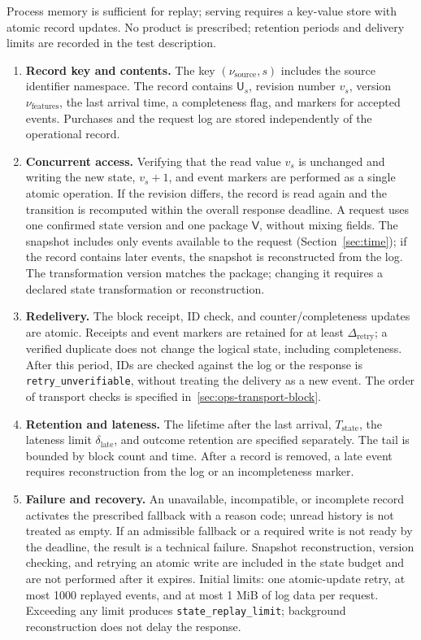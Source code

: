 \documentclass[12pt,a4paper]{article}
\newcommand{\code}[1]{{\ttfamily\small\nolinkurl{#1}}}
\theoremstyle{plainru}
\begin{document}
Process memory is sufficient for replay; serving requires
a key-value store with atomic record updates. No product is prescribed;
retention periods and delivery limits are recorded in the test description.
\begin{enumerate}
\item \textbf{Record key and contents.}
The key $(\nu_{\mathrm{source}},s)$ includes the source identifier
namespace. The record contains $\mathsf U_s$, revision number $v_s$,
version $\nu_{\mathrm{features}}$, the last arrival time,
a completeness flag, and markers for accepted events.
Purchases and the request log are stored independently of the operational record.

\item \textbf{Concurrent access.}
Verifying that the read value $v_s$ is unchanged and writing the new state,
$v_s+1$, and event markers are performed as a single atomic operation.
If the revision differs, the record is read again and the transition is recomputed
within the overall response deadline.
A request uses one confirmed state version and one package
$\mathsf V$, without mixing fields. The snapshot includes only events available to the request
(Section~\ref{sec:time}); if the record contains later
events, the snapshot is reconstructed from the log.
The transformation version matches the package; changing it requires
a declared state transformation or reconstruction.

\item \textbf{Redelivery.}
The block receipt, ID check, and counter/completeness updates are atomic.
Receipts and event markers are retained for at least $\Delta_{\mathrm{retry}}$;
a verified duplicate does not change the logical state, including completeness.
After this period, IDs are checked against the log or the response is
\code{retry_unverifiable}, without treating the delivery as a new event.
The order of transport checks is specified in~\ref{sec:ops-transport-block}.

\item \textbf{Retention and lateness.}
The lifetime after the last arrival,
$T_{\mathrm{state}}$, the lateness limit $\delta_{\mathrm{late}}$,
and outcome retention are specified separately. The tail is bounded by block count and time.
After a record is removed, a late event requires reconstruction
from the log or an incompleteness marker.

\item \textbf{Failure and recovery.}
An unavailable, incompatible, or incomplete record activates the prescribed fallback
with a reason code; unread history is not treated as empty.
If an admissible fallback or a required write is not ready by the deadline,
the result is a technical failure.
Snapshot reconstruction, version checking, and retrying an atomic write
are included in the state budget and are not performed after it expires.
Initial limits: one atomic-update retry,
at most 1000 replayed events, and at most 1 MiB of log data
per request. Exceeding any limit produces
\code{state_replay_limit}; background reconstruction does not delay the response.


\end{enumerate}
\end{document}
